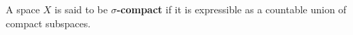 A space $X$ is said to be \textbf{$\sigma$-compact} if it is expressible as a countable union of compact subspaces.
